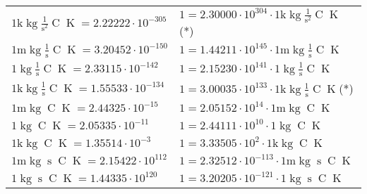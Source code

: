 \begin{center}
\begin{longtable}{l l}
{\color{gray}$1 \bm{\mathrm{ k}}\operatorname{kg}{}\frac1{\operatorname{s}^2}{\operatorname{C}}{\operatorname{K}} = 2.22222\cdot10^{-305} $}   & {\color{gray}$ 1 = 2.30000\cdot10^{304} \cdot 1 \bm{\mathrm{ k}}\operatorname{kg}{}\frac1{\operatorname{s}^2}{\operatorname{C}}{\operatorname{K}}$}\quad(*)\\
{\color{gray}$1 \bm{\mathrm{ m}}\operatorname{kg}{}\frac1{\operatorname{s}}{\operatorname{C}}{\operatorname{K}} = 3.20452\cdot10^{-150} $}   & {\color{gray}$ 1 = 1.44211\cdot10^{145} \cdot 1 \bm{\mathrm{ m}}\operatorname{kg}{}\frac1{\operatorname{s}}{\operatorname{C}}{\operatorname{K}}$}  \\
{\color{black}$1 \bm{\mathrm{ }}\operatorname{kg}{}\frac1{\operatorname{s}}{\operatorname{C}}{\operatorname{K}} = 2.33115\cdot10^{-142} $}   & {\color{black}$ 1 = 2.15230\cdot10^{141} \cdot 1 \bm{\mathrm{ }}\operatorname{kg}{}\frac1{\operatorname{s}}{\operatorname{C}}{\operatorname{K}}$}  \\
{\color{gray}$1 \bm{\mathrm{ k}}\operatorname{kg}{}\frac1{\operatorname{s}}{\operatorname{C}}{\operatorname{K}} = 1.55533\cdot10^{-134} $}   & {\color{gray}$ 1 = 3.00035\cdot10^{133} \cdot 1 \bm{\mathrm{ k}}\operatorname{kg}{}\frac1{\operatorname{s}}{\operatorname{C}}{\operatorname{K}}$}\quad(*)\\
{\color{gray}$1 \bm{\mathrm{ m}}\operatorname{kg}{}{}{\operatorname{C}}{\operatorname{K}} = 2.44325\cdot10^{-15} $}   & {\color{gray}$ 1 = 2.05152\cdot10^{14} \cdot 1 \bm{\mathrm{ m}}\operatorname{kg}{}{}{\operatorname{C}}{\operatorname{K}}$}  \\
{\color{black}$1 \bm{\mathrm{ }}\operatorname{kg}{}{}{\operatorname{C}}{\operatorname{K}} = 2.05335\cdot10^{-11} $}   & {\color{black}$ 1 = 2.44111\cdot10^{10} \cdot 1 \bm{\mathrm{ }}\operatorname{kg}{}{}{\operatorname{C}}{\operatorname{K}}$}  \\
{\color{gray}$1 \bm{\mathrm{ k}}\operatorname{kg}{}{}{\operatorname{C}}{\operatorname{K}} = 1.35514\cdot10^{-3} $}   & {\color{gray}$ 1 = 3.33505\cdot10^{2} \cdot 1 \bm{\mathrm{ k}}\operatorname{kg}{}{}{\operatorname{C}}{\operatorname{K}}$}  \\
{\color{gray}$1 \bm{\mathrm{ m}}\operatorname{kg}{}{\operatorname{s}}{\operatorname{C}}{\operatorname{K}} = 2.15422\cdot10^{112} $}   & {\color{gray}$ 1 = 2.32512\cdot10^{-113} \cdot 1 \bm{\mathrm{ m}}\operatorname{kg}{}{\operatorname{s}}{\operatorname{C}}{\operatorname{K}}$}  \\
{\color{black}$1 \bm{\mathrm{ }}\operatorname{kg}{}{\operatorname{s}}{\operatorname{C}}{\operatorname{K}} = 1.44335\cdot10^{120} $}   & {\color{black}$ 1 = 3.20205\cdot10^{-121} \cdot 1 \bm{\mathrm{ }}\operatorname{kg}{}{\operatorname{s}}{\operatorname{C}}{\operatorname{K}}$}  \\

\end{longtable}
\end{center}
